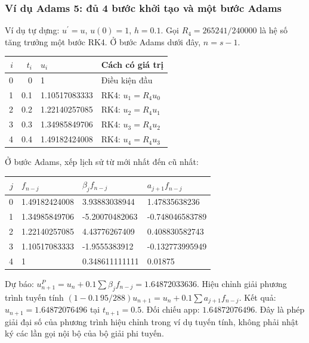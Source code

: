 \subsubsection*{Ví dụ Adams 5: đủ 4 bước khởi tạo và một bước Adams}
Ví dụ tự dựng: $u^{\prime}=u$, $u(0)=1$, $h=0.1$. Gọi $R_4=265241/240000$ là hệ số tăng trưởng một bước RK4. Ở bước Adams dưới đây, $n=s-1$.
\begin{center}\begin{tabular}{rrll}\toprule $i$&$t_i$&$u_i$&Cách có giá trị\\\midrule
0&0&1&Điều kiện đầu\\
1&0.1&1.10517083333&RK4: $u_1 = R_4u_{0}$\\
2&0.2&1.22140257085&RK4: $u_2 = R_4u_{1}$\\
3&0.3&1.34985849706&RK4: $u_3 = R_4u_{2}$\\
4&0.4&1.49182424008&RK4: $u_4 = R_4u_{3}$\\
\bottomrule\end{tabular}\end{center}
Ở bước Adams, xếp lịch sử từ mới nhất đến cũ nhất:
\begin{center}\begin{tabular}{rlll}\toprule $j$&$f_{n-j}$&$\beta_jf_{n-j}$&$a_{j+1}f_{n-j}$\\\midrule
0&1.49182424008&3.93883038944&1.47835638236\\
1&1.34985849706&-5.20070482063&-0.748046583789\\
2&1.22140257085&4.43776267409&0.408830582743\\
3&1.10517083333&-1.9555383912&-0.132773995949\\
4&1&0.348611111111&0.01875\\
\bottomrule\end{tabular}\end{center}
Dự báo: $u_{n+1}^P=u_n+0.1\sum\beta_jf_{n-j}=1.64872033636$.
Hiệu chỉnh giải phương trình tuyến tính $(1-0.1\,95/288)u_{n+1}=u_n+0.1\sum a_{j+1}f_{n-j}$.
Kết quả: $u_{n+1}=1.64872076496$ tại $t_{n+1}=0.5$. Đối chiếu app: $1.64872076496$.
Đây là phép giải đại số của phương trình hiệu chỉnh trong ví dụ tuyến tính, không phải nhật ký các lần gọi nội bộ của bộ giải phi tuyến.
